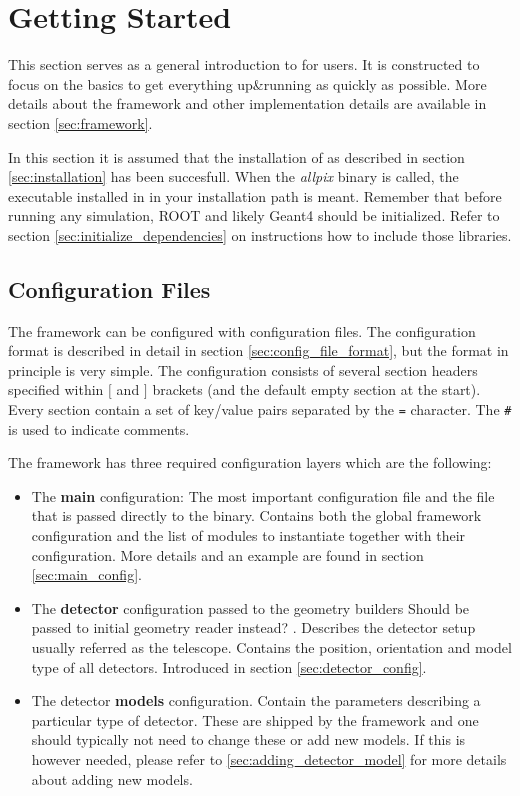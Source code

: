 \section{Getting Started}
This section serves as a general introduction to \apsq for users. It is constructed to focus on the basics to get everything up\&running as quickly as possible. More details about the framework and other implementation details are available in section \ref{sec:framework}.

In this section it is assumed that the installation of \apsq as described in section \ref{sec:installation} has been succesfull. When the \textit{allpix} binary is called, the executable installed in  in your installation path is meant. Remember that before running any \apsq simulation, ROOT and likely Geant4 should be initialized. Refer to section \ref{sec:initialize_dependencies} on instructions how to include those libraries.

\subsection{Configuration Files}
\label{sec:configuration_files}
The framework can be configured with configuration files. The configuration format is described in detail in section \ref{sec:config_file_format}, but the format in principle is very simple. The configuration consists of several section headers specified within $[$ and $]$ brackets (and the default empty section at the start). Every section contain a set of key/value pairs separated by the \texttt{=} character. The \texttt{\#} is used to indicate comments.

The framework has three required configuration layers which are the following:
\begin{itemize}
\item The \textbf{main} configuration: The most important configuration file and the file that is passed directly to the binary. Contains both the global framework configuration and the list of modules to instantiate together with their configuration. More details and an example are found in section \ref{sec:main_config}.
\item The \textbf{detector} configuration passed to the geometry builders \todo Should be passed to initial geometry reader instead? \todo. Describes the detector setup usually referred as the telescope. Contains the position, orientation and model type of all detectors. Introduced in section \ref{sec:detector_config}.
\item The detector \textbf{models} configuration. Contain the parameters describing a particular type of detector. These are shipped by the framework and one should typically not need to change these or add new models. If this is however needed, please refer to \ref{sec:adding_detector_model} for more details about adding new models.
\end{itemize}

